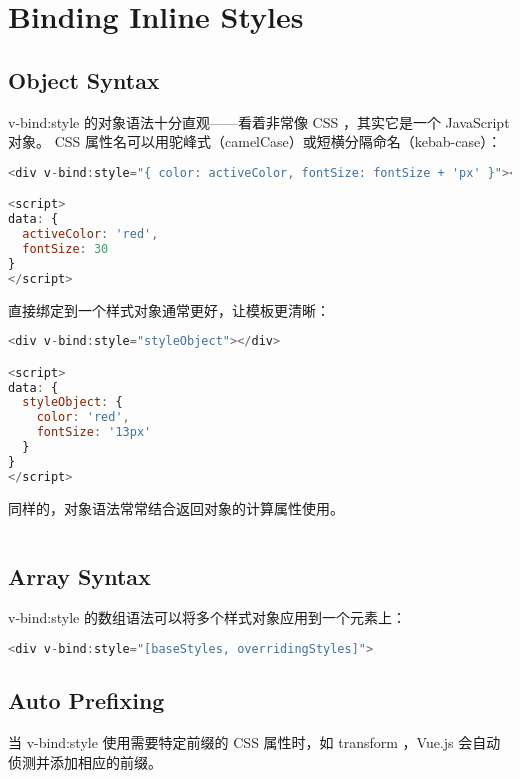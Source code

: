 \section{Binding Inline Styles}



\subsection{Object Syntax}

v-bind:style 的对象语法十分直观——看着非常像 CSS ，其实它是一个 JavaScript 对象。 CSS 属性名可以用驼峰式（camelCase）或短横分隔命名（kebab-case）：


\begin{lstlisting}[language=JavaScript]
<div v-bind:style="{ color: activeColor, fontSize: fontSize + 'px' }"></div>

<script>
data: {
  activeColor: 'red',
  fontSize: 30
}
</script>
\end{lstlisting}

直接绑定到一个样式对象通常更好，让模板更清晰：


\begin{lstlisting}[language=JavaScript]
<div v-bind:style="styleObject"></div>

<script>
data: {
  styleObject: {
    color: 'red',
    fontSize: '13px'
  }
}
</script>
\end{lstlisting}

同样的，对象语法常常结合返回对象的计算属性使用。

\begin{lstlisting}[language=JavaScript]

\end{lstlisting}



\subsection{Array Syntax}

v-bind:style 的数组语法可以将多个样式对象应用到一个元素上：


\begin{lstlisting}[language=JavaScript]
<div v-bind:style="[baseStyles, overridingStyles]">
\end{lstlisting}





\subsection{Auto Prefixing}

当 v-bind:style 使用需要特定前缀的 CSS 属性时，如 transform ，Vue.js 会自动侦测并添加相应的前缀。

